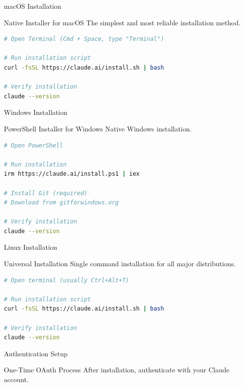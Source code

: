 \documentclass[9pt]{beamer}
\begin{document}
{\small	\begin{frame}[fragile]{macOS Installation}
		\begin{exampleblock}{Native Installer for macOS}
			The simplest and most reliable installation method.
		\end{exampleblock}
		
\begin{lstlisting}[language=bash]
# Open Terminal (Cmd + Space, type "Terminal")

# Run installation script
curl -fsSL https://claude.ai/install.sh | bash

# Verify installation
claude --version
\end{lstlisting}
		
		\vspace{0.3cm}
	\end{frame}
	
	\begin{frame}[fragile]{Windows Installation}
		\begin{exampleblock}{PowerShell Installer for Windows}
			Native Windows installation.
		\end{exampleblock}
		
\begin{lstlisting}[language=bash]
# Open PowerShell

# Run installation
irm https://claude.ai/install.ps1 | iex

# Install Git (required)
# Download from gitforwindows.org

# Verify installation
claude --version
\end{lstlisting}
		

	\end{frame}
	

	\begin{frame}[fragile]{Linux Installation}
		\begin{exampleblock}{Universal Installation}
			Single command installation for all major distributions.
		\end{exampleblock}

		
\begin{lstlisting}[language=bash]
# Open terminal (usually Ctrl+Alt+T)

# Run installation script
curl -fsSL https://claude.ai/install.sh | bash

# Verify installation
claude --version
\end{lstlisting}
	\end{frame}

	\begin{frame}[fragile]{Authentication Setup}
		\footnotesize
		\begin{block}{One-Time OAuth Process}
			After installation, authenticate with your Claude account.
		\end{block}
		

\end{frame}}
\end{document}
